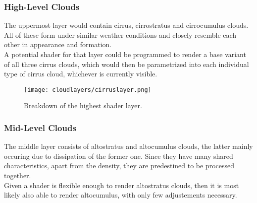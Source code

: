\begin{figure}[H]
    \centering
    \label{img:tikz:shadersetup}       
\end{figure}

\pagebreak

\subsubsection{High-Level Clouds}
The uppermost layer would contain cirrus, cirrostratus and cirrocumulus clouds.
All of these form under similar weather conditions and closely resemble each other in appearance and formation.
\\
A potential \gls{shader} for that layer could be programmed to render a base variant of all three cirrus clouds, which would then be parametrized into each individual type of cirrus cloud, whichever is currently visible.

\begin{figure}[H]
    \texttt{[image: cloudlayers/cirruslayer.png]}
    \caption{Breakdown of the highest shader layer.}
    \label{img:cloudlayer:cirrus}
\end{figure}

\subsubsection{Mid-Level Clouds}
The middle layer consists of altostratus and altocumulus clouds, the latter mainly occuring due to dissipation of the former one.
Since they have many shared characteristics, apart from the density, they are predestined to be processed together.
\\
Given a \gls{shader} is flexible enough to render altostratus clouds, then it is most likely also able to render altocumulus, with only few adjustements necessary.


